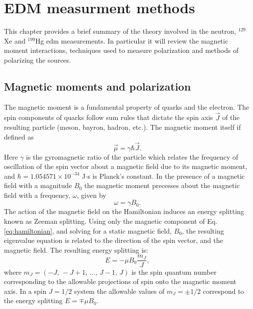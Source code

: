 \chapter{EDM measurment methods}

This chapter provides a brief summary of the theory involved in the neutron, $^{129}$Xe and $^{199}$Hg \gls{edm} measurements. In particular it will review the magnetic moment interactions, techniques used to measure polarization and methods of polarizing the sources. 

\section{Magnetic moments and polarization}

The magnetic moment is a fundamental property of quarks and the electron. The spin components of quarks follow sum rules that dictate the spin axis $\vec{J}$ of the resulting particle (meson, bayron, hadron, etc.). The magnetic moment itself if defined as
\begin{equation}
    \vec{\mu}=\gamma \hbar \vec{J}.
\end{equation}
Here  $\gamma$ is the gyromagnetic ratio of the particle which relates the frequency of oscillation of the spin vector about a magnetic field due to its magnetic moment, and $\hbar = 1.054571\times 10^{−34}$ J$\cdot$s is Planck's constant.  In the presence of a magnetic field with a magnitude $B_0$ the magnetic moment precesses about the magnetic field with a frequency, $\omega$, given by
\begin{equation} \label{eq:bfrequency}
    \omega = \gamma B_0 .
\end{equation}
The action of the magnetic field on the Hamiltonian induces an energy splitting known as Zeeman splitting. Using only the magnetic component of Eq. \ref{eq:hamiltonian}, and solving for a static magnetic field, $B_0$, the resulting eigenvalue equation is related to the direction of the spin vector, and the magnetic field. The resulting energy splitting is: 
\begin{equation}
    E = -\mu B_0 \frac{m_J}{J}, %
\end{equation}
where $m_J = (-J,\, -J+1,\, \ldots,\, J-1,\, J ) $ is the spin quantum number corresponding to the allowable projections of spin onto the magnetic moment axis. In a spin $J=1/2$ system the allowable values of $m_J=\pm 1/2$ correspond to the energy splitting $E=\mp \mu B_0$. 


